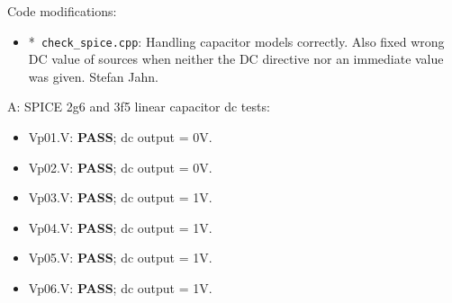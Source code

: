\begin{flushleft}
 Code modifications:
\begin{itemize}
 \item *\verb| check_spice.cpp|: Handling capacitor models correctly.
        Also fixed wrong DC value of sources when neither the DC
        directive nor an immediate value was given. Stefan Jahn.
\end{itemize}

A: SPICE 2g6 and 3f5 linear capacitor dc tests:

\begin{itemize}
 \item Vp01.V: \textbf{PASS}; dc output = 0V.
 \item Vp02.V: \textbf{PASS}; dc output = 0V.
 \item Vp03.V: \textbf{PASS}; dc output = 1V.
 \item Vp04.V: \textbf{PASS}; dc output = 1V.
 \item Vp05.V: \textbf{PASS}; dc output = 1V.
 \item Vp06.V: \textbf{PASS}; dc output = 1V.
 \end{itemize}

\end{flushleft}



